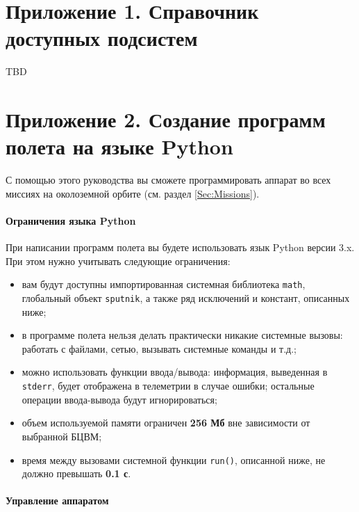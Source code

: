 \documentclass[12pt,a4paper]{article}
\begin{document}
\section*{Приложение 1. Справочник доступных подсистем}
\label{Sec:Subsystems}

TBD

\section*{Приложение 2. Создание программ полета на языке Python}
\label{Sec:Python}

С помощью этого руководства вы сможете программировать аппарат во всех миссиях на
околоземной орбите (см. раздел \ref{Sec:Missions}).

\paragraph{Ограничения языка Python}
При написании программ полета вы будете использовать язык Python версии 3.x. При этом
нужно учитывать следующие ограничения:

\begin{itemize}
  \item вам будут доступны импортированная системная библиотека \verb'math', глобальный
    объект \verb'sputnik', а также ряд исключений и констант, описанных ниже;
  \item в программе полета нельзя делать практически никакие системные вызовы: работать с
    файлами, сетью, вызывать системные команды и т.д.;
  \item можно использовать функции ввода/вывода: информация, выведенная в \verb'stderr',
    будет отображена в телеметрии в случае ошибки; остальные операции ввода-вывода будут
    игнорироваться;
  \item объем используемой памяти ограничен \textbf{256 Мб} вне зависимости от выбранной БЦВМ;
  \item время между вызовами системной функции \verb'run()', описанной ниже, не должно
    превышать \textbf{0.1 с}.
\end{itemize}

\paragraph{Управление аппаратом}
\end{document}
